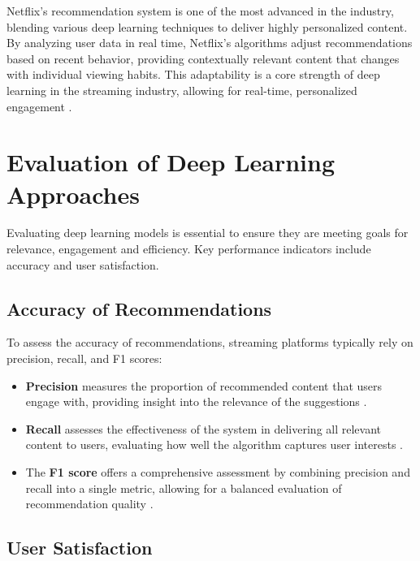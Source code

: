 \documentclass[12pt,english,a4paper]{article}
\begin{document}
\hspace*{2em}Netflix’s recommendation system is one of the most advanced in the industry, blending various deep learning techniques to deliver highly personalized content. By analyzing user data in real time, Netflix’s algorithms adjust recommendations based on recent behavior, providing contextually relevant content that changes with individual viewing habits. This adaptability is a core strength of deep learning in the streaming industry, allowing for real-time, personalized engagement \cite{Steck20217,Gomez-Uribe2015}.

\section{Evaluation of Deep Learning Approaches}

\hspace*{2em}Evaluating deep learning models is essential to ensure they are meeting goals for relevance, engagement and efficiency. Key performance indicators include accuracy and user satisfaction.

\subsection{Accuracy of Recommendations}

\hspace*{2em}To assess the accuracy of recommendations, streaming platforms typically rely on precision, recall, and F1 scores:

\begin{itemize}
    \item \textbf{Precision} measures the proportion of recommended content that users engage with, providing insight into the relevance of the suggestions \cite{Fayyaz20201}.
    
    \item \textbf{Recall} assesses the effectiveness of the system in delivering all relevant content to users, evaluating how well the algorithm captures user interests \cite{Fayyaz20201}.
    
    \item The \textbf{F1 score} offers a comprehensive assessment by combining precision and recall into a single metric, allowing for a balanced evaluation of recommendation quality \cite{Fayyaz20201}.
\end{itemize}

\subsection{User Satisfaction}
\end{document}
